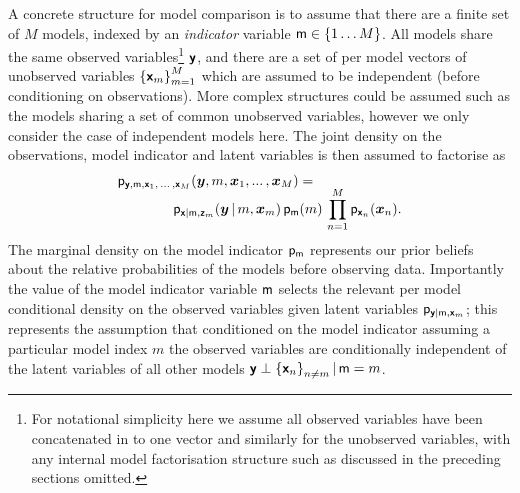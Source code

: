 A concrete structure for model comparison is to assume that there are a finite set of $M$ models, indexed by an \emph{indicator} variable $\rvar{m} \in \fset{1 \dots M}$. All models share the same observed variables\footnote{For notational simplicity here we assume all observed variables have been concatenated in to one vector and similarly for the unobserved variables, with any internal model factorisation structure such as discussed in the preceding sections omitted.} $\boldsymbol{\mathsf{y}}$, and there are a set of per model vectors of unobserved variables $\fset{\rvct{x}_m}_{m=1}^M$ which are assumed to be independent (before conditioning on observations). More complex structures could be assumed such as the models sharing a set of common unobserved variables, however we only consider the case of independent models here. The joint density on the observations, model indicator and latent variables is then assumed to factorise as
\begin{equation}\label{eq:multi-model-joint}
\begin{split}
  &\mathsf{p}_{\boldsymbol{\mathsf{y}},\mathsf{m},\boldsymbol{\mathsf{x}}_1,\,...\, ,\boldsymbol{\mathsf{x}}_M}
  (\boldsymbol{y},m,\boldsymbol{x}_1,...\, ,\boldsymbol{x}_M) =\\[-2mm]
  &\qquad\qquad
  \mathsf{p}_{\boldsymbol{\mathsf{x}}|\mathsf{m},\boldsymbol{\mathsf{z}}_m}(\boldsymbol{y}\operatorname{|} m,\boldsymbol{x}_m)\,
  \mathsf{p}_{\mathsf{m}}(m)\,
  \prod_{n=1}^M \mathsf{p}_{\boldsymbol{\mathsf{x}}_n}(\boldsymbol{x}_n).
\end{split}
\end{equation}
The marginal density on the model indicator $\mathsf{p}_{\mathsf{m}}$ represents our prior beliefs about the relative probabilities of the models before observing data. Importantly the value of the model indicator variable $\mathsf{m}$ selects the relevant per model conditional density on the observed variables given latent variables $\mathsf{p}_{\boldsymbol{\mathsf{y}}|\mathsf{m},\boldsymbol{\mathsf{x}}_m}$; this represents the assumption that conditioned on the model indicator assuming a particular model index $m$ the observed variables are conditionally independent of the latent variables of all other models $\rvct{y} \perp \fset{\rvct{x}_n}_{n\neq m} \gvn \rvar{m} = m$. %

